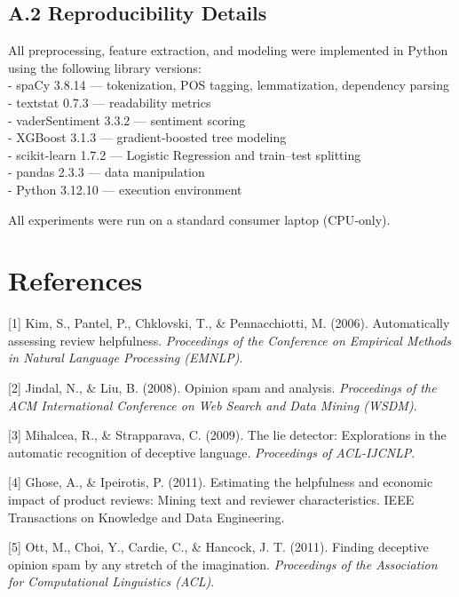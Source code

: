 \hypertarget{a.2-reproducibility-details}{%
\subsection{A.2 Reproducibility
Details}\label{a.2-reproducibility-details}}

All preprocessing, feature extraction, and modeling were implemented in
Python using the following library versions:\\
- spaCy 3.8.14 --- tokenization, POS tagging, lemmatization, dependency
parsing\\
- textstat 0.7.3 --- readability metrics\\
- vaderSentiment 3.3.2 --- sentiment scoring\\
- XGBoost 3.1.3 --- gradient‑boosted tree modeling\\
- scikit-learn 1.7.2 --- Logistic Regression and train--test splitting\\
- pandas 2.3.3 --- data manipulation\\
- Python 3.12.10 --- execution environment

All experiments were run on a standard consumer laptop (CPU‑only).

\hypertarget{references}{%
\section{References}\label{references}}

{[}1{]} Kim, S., Pantel, P., Chklovski, T., \& Pennacchiotti, M. (2006).
Automatically assessing review helpfulness. \emph{Proceedings of the
Conference on Empirical Methods in Natural Language Processing (EMNLP)}.

{[}2{]} Jindal, N., \& Liu, B. (2008). Opinion spam and analysis.
\emph{Proceedings of the ACM International Conference on Web Search and
Data Mining (WSDM)}.

{[}3{]} Mihalcea, R., \& Strapparava, C. (2009). The lie detector:
Explorations in the automatic recognition of deceptive language.
\emph{Proceedings of ACL‑IJCNLP}.

{[}4{]} Ghose, A., \& Ipeirotis, P. (2011). Estimating the helpfulness
and economic impact of product reviews: Mining text and reviewer
characteristics. IEEE Transactions on Knowledge and Data Engineering.

{[}5{]} Ott, M., Choi, Y., Cardie, C., \& Hancock, J. T. (2011). Finding
deceptive opinion spam by any stretch of the imagination.
\emph{Proceedings of the Association for Computational Linguistics
(ACL)}.

